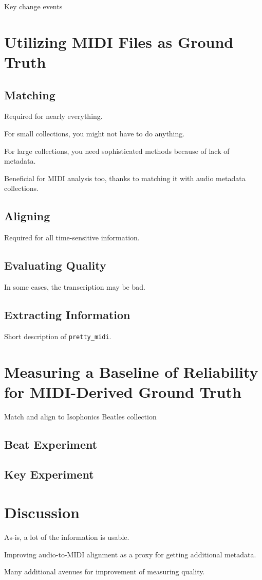 \documentclass{article}
\begin{document}
Key change events

\section{Utilizing MIDI Files as Ground Truth}

\subsection{Matching}

Required for nearly everything.

For small collections, you might not have to do anything.

For large collections, you need sophisticated methods because of lack of metadata.

Beneficial for MIDI analysis too, thanks to matching it with audio metadata collections.

\subsection{Aligning}

Required for all time-sensitive information.

\subsection{Evaluating Quality}

In some cases, the transcription may be bad.

\subsection{Extracting Information}

Short description of \texttt{pretty\_midi}.

\section{Measuring a Baseline of Reliability for MIDI-Derived Ground Truth}

Match and align to Isophonics Beatles collection

\subsection{Beat Experiment}

\subsection{Key Experiment}

\section{Discussion}

As-is, a lot of the information is usable.

Improving audio-to-MIDI alignment as a proxy for getting additional metadata.

Many additional avenues for improvement of measuring quality.
\end{document}
